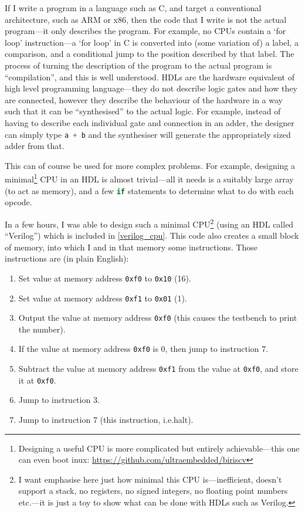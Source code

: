 \documentclass[12pt]{article}
\begin{document}
If I write a program in a language such as C, and target a conventional architecture, such as ARM or x86, then the code that I write is not the actual program---it only describes the program. For example, no CPUs contain a `for loop' instruction---a `for loop' in C is converted into (some variation of) a label, a comparison, and a conditional jump to the position described by that label. The process of turning the description of the program to the actual program is ``compilation'', and this is well understood.
HDLs are the hardware equivalent of high level programming language---they do not describe logic gates and how they are connected, however they describe the behaviour of the hardware in a way such that it can be ``synthesised'' to the actual logic. For example, instead of having to describe each individual gate and connection in an adder, the designer can simply type \lstinline[language=Verilog]|a + b| and the synthesiser will generate the appropriately sized adder from that.

This can of course be used for more complex problems. For example, designing a minimal\footnote{Designing a useful CPU is more complicated but entirely achievable---this one can even boot inux: \url{https://github.com/ultraembedded/biriscv}} CPU in an HDL is almost trivial---all it needs is a suitably large array (to act as memory), and a few \lstinline[language=Verilog]|if| statements to determine what to do with each opcode.

In a few hours, I was able to design such a minimal CPU\footnote{I want emphasise here just how minimal this CPU is---inefficient, doesn't support a stack, no registers, no signed integers, no floating point numbers etc.\@---it is just a toy to show what can be done with HDLs such as Verilog.} (using an HDL called ``Verilog'') which is included in \ref{verilog_cpu}. This code also creates a small block of memory, into which I and in that memory some instructions. Those instructions are (in plain English):

\begin{enumerate}
	\item Set value at memory address \texttt{0xf0} to \texttt{0x10} (16).
	\item Set value at memory address \texttt{0xf1} to \texttt{0x01} (1).
	\item Output the value at memory address \texttt{0xf0} (this causes the testbench to print the number).
	\item If the value at memory address \texttt{0xf0} is 0, then jump to instruction 7.
	\item Subtract the value at memory address \texttt{0xf1} from the value at \texttt{0xf0}, and store it at \texttt{0xf0}.
	\item Jump to instruction 3.
	\item Jump to instruction 7 (this instruction, i.e.\@ halt).
\end{enumerate}
\end{document}
